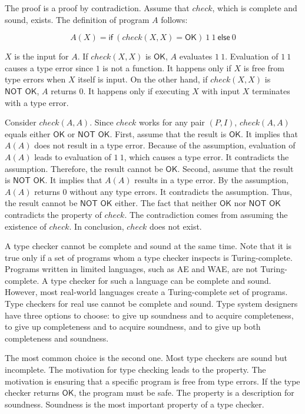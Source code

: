 The proof is a proof by contradiction. Assume that $check$, which is complete and
sound, exists. The definition of program $A$ follows:

\[
A(X) =
\textsf{if}\ (\mathit{check}(X, X)=\textsf{OK})\ 1\ 1\
\textsf{else}\ 0
\]

$X$ is the input for $A$. If $check(X,X)$ is $\textsf{OK}$, $A$ evaluates $1\ 1$.
Evaluation of $1\ 1$ causes a type error since $1$ is not a function. It happens
only if $X$ is free from type errors when $X$ itself is input. On the other hand,
if $check(X,X)$ is $\textsf{NOT OK}$, $A$ returns $0$. It happens only if
executing $X$ with input $X$ terminates with a type error.

Consider $check(A,A)$. Since $check$ works for any pair $(P,I)$, $check(A,A)$
equals either $\textsf{OK}$ or $\textsf{NOT OK}$. First, assume that the result
is $\textsf{OK}$. It implies that $A(A)$ does not result in a type error. Because
of the assumption, evaluation of $A(A)$ leads to evaluation of $1\ 1$, which
causes a type error. It contradicts the assumption. Therefore, the result cannot
be $\textsf{OK}$. Second, assume that the result is $\textsf{NOT OK}$. It implies
that $A(A)$ results in a type error. By the assumption, $A(A)$ returns $0$
without any type errors. It contradicts the assumption. Thus, the result cannot
be $\textsf{NOT OK}$ either. The fact that neither $\textsf{OK}$ nor $\textsf{NOT
OK}$ contradicts the property of $check$. The contradiction comes from assuming
the existence of $check$. In conclusion, $check$ does not exist.

A type checker cannot be complete and sound at the same time. Note that it is
true only if a set of programs whom a type checker inspects is Turing-complete.
Programs written in limited languages, such as AE and WAE, are not
Turing-complete. A type checker for such a language can be complete and sound.
However, most real-world languages create a Turing-complete set of programs. Type
checkers for real use cannot be complete and sound. Type system designers have
three options to choose: to give up soundness and to acquire completeness, to
give up completeness and to acquire soundness, and to give up both completeness
and soundness.

The most common choice is the second one. Most type checkers are sound but
incomplete. The motivation for type checking leads to the property. The
motivation is ensuring that a specific program is free from type errors. If the
type checker returns $\textsf{OK}$, the program must be safe. The property is a
description for soundness. Soundness is the most important property of a type
checker.

